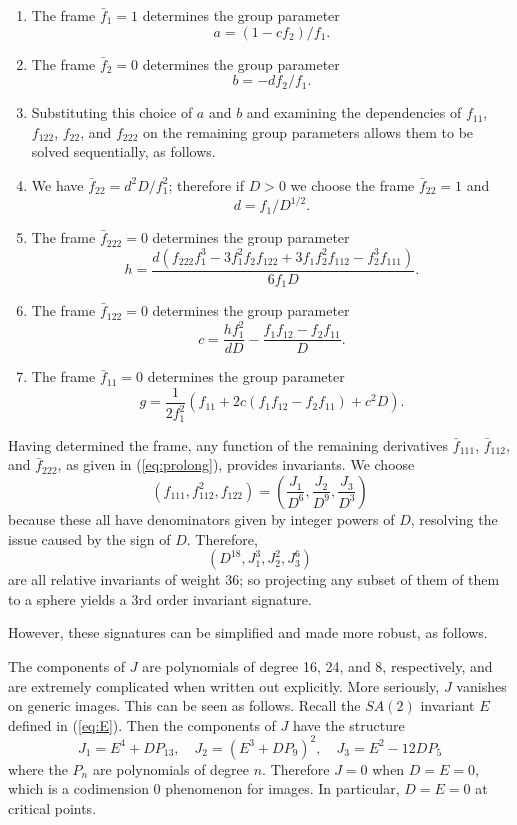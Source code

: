 \documentclass{article}
\begin{document}
\begin{enumerate}
\item The frame $\bar f_1 = 1$  determines the group parameter $$a = (1-c f_2)/f_1.$$
\item The frame $\bar f_2=  0$ determines the group parameter $$b = -d f_2/f_1.$$
\item Substituting this choice of $a$ and $b$ and examining the dependencies of $f_{11}$, $f_{122}$, $f_{22}$, and $f_{222}$ on the remaining group parameters allows them to be solved sequentially, as follows.
\item We have $\bar f_{22} = d^2 D/f_1^2$; therefore if $D>0$ we choose the frame
$\bar f_{22} = 1$ and $$d = f_1/D^{1/2}.$$
\item The frame $\bar f_{222} = 0$ determines the group parameter
$$ h = \frac{d(f_{222}f_1^3 - 3 f_1^2 f_2 f_{122} + 3 f_1 f_2^2 f_{112} - f_2^3 f_{111})}{6 f_1 D}.$$
\item The frame $\bar f_{122}=0$ determines the group parameter
$$ c = \frac{h f_1^2}{d D} - \frac{f_1 f_{12} - f_2 f_{11}}{D}.$$
\item The frame $\bar f_{11}=0$ determines the group parameter
$$ g = \frac{1}{2 f_1^2}(f_{11} + 2 c ( f_1 f_{12} - f_2 f_{11} ) + c^2 D).$$
\end{enumerate}

Having determined the frame, any function of the remaining derivatives $\bar f_{111}$, $\bar f_{112}$, and $\bar f_{222}$,
as given in (\ref{eq:prolong}),
provides invariants. We choose
$$ (f_{111}, f_{112}^2, f_{122})=\left(\frac{J_1}{D^6},\frac{J_2}{D^9},\frac{J_3}{D^3}\right)$$
because these all have denominators given by integer powers  of $D$, resolving the issue caused
by the sign of $D$. Therefore,
$$ (D^{18}, J_1^3, J_2^2, J_3^6)$$
are all relative invariants of weight 36; so projecting any subset of them of them to a sphere
yields a 3rd order invariant signature.

However, these signatures can be simplified and made more robust, as follows.

The components of $J$ are polynomials of degree 16, 24, and 8, respectively, and are extremely complicated when written out explicitly. More seriously, $J$ vanishes on generic images. This can be seen as follows. 
Recall the $SA(2)$ invariant $E$ defined in (\ref{eq:E}).
Then the components of $J$ have the structure
$$ J_1 = E^4 + D P_{13},\quad J_2 = (E^3 + D P_9)^2,\quad J_3=E^2 -12 D P_5$$
where the $P_n$ are polynomials of degree $n$. Therefore $J=0$ when $D=E=0$, which 
is a codimension 0 phenomenon for images. In particular, $D=E=0$ at critical points.
\end{document}

